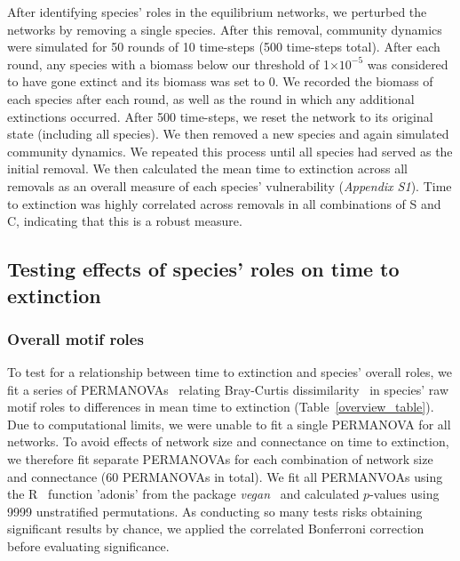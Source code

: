 \documentclass[12pt]{article}
\begin{document}
\begin{spacing}{2.0}
    		After identifying species' roles in the equilibrium networks, we perturbed the networks by removing a single species. After this removal, community dynamics were simulated for 50 rounds of 10 time-steps (500 time-steps total). After each round, any species with a biomass below our threshold of 1$\times10^{-5}$ was considered to have gone extinct and its biomass was set to 0. We recorded the biomass of each species after each round, as well as the round in which any additional extinctions occurred. After 500 time-steps, we reset the network to its original state (including all species). We then removed a new species and again simulated community dynamics. We repeated this process until all species had served as the initial removal.
    		We then calculated the mean time to extinction across all removals as an overall measure of each species' vulnerability (\emph{Appendix S1}). 
    		Time to extinction was highly correlated across removals in all combinations of S and C, indicating that this is a robust measure.


	\subsection*{Testing effects of species' roles on time to extinction}

		\subsubsection*{Overall motif roles}

			To test for a relationship between time to extinction and species' overall roles, we fit a series of PERMANOVAs~\citep{Anderson2001} relating Bray-Curtis dissimilarity~\citep{Baker2015,Cirtwill2015} in species' raw motif roles to differences in mean time to extinction (Table~\ref{overview_table}).
			Due to computational limits, we were unable to fit a single PERMANOVA for all networks.
			To avoid effects of network size and connectance on time to extinction, we therefore fit separate PERMANOVAs for each combination of network size and connectance (60 PERMANOVAs in total).
			We fit all PERMANVOAs using the R~\citep{R} function 'adonis' from the package \emph{vegan}~\citep{vegan} and calculated $p$-values using 9999 unstratified permutations.
			As conducting so many tests risks obtaining significant results by chance, we applied the correlated Bonferroni correction~\citep{Drezner2016} before evaluating significance.
			

\end{spacing}
\end{document}
